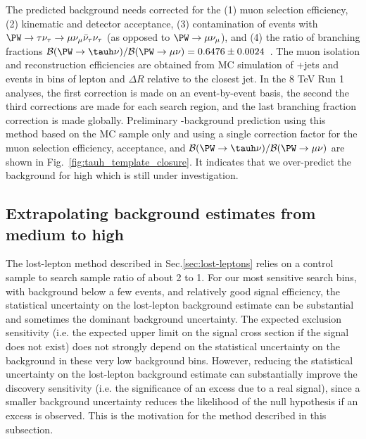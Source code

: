 % 
The predicted background needs corrected for the (1) muon selection efficiency, 
(2) kinematic and detector acceptance, 
(3) contamination of events with $\PW\rightarrow\tau\nu_{\tau}\rightarrow\mu\nu_\mu\bar{\nu}_{\tau}\nu_{\tau}$
(as opposed to $\PW\rightarrow\mu\nu_{\mu}$),
and (4) the ratio of branching fractions
$\mathcal{B}(\PW\rightarrow\tauh\nu)/\mathcal{B}(\PW\rightarrow\mu\nu)= 0.6476 \pm 0.0024$~\cite{PDG}.
The muon isolation and reconstruction efficiencies
are obtained from MC simulation of \PW{}+jets and \ttbar events 
in bins of lepton \pt and $\Delta R$
relative to the closest jet.
In the 8 TeV Run 1 analyses, the first correction is made on an event-by-event basis,
the second the third corrections are made for each search region, and the
last branching fraction correction is made globally.
Preliminary \tauh{}-background prediction using this method based on the \ttbar MC sample
only and using a single correction factor for the muon selection efficiency,
acceptance, and $\mathcal{B}(\PW\rightarrow\tauh\nu)/\mathcal{B}(\PW\rightarrow\mu\nu)$
are shown in Fig.~\ref{fig:tauh_template_closure}.
It indicates that we over-predict the background for high \nbjets which is still under investigation.




\clearpage
\subsection{Extrapolating background estimates from medium to high \MHT }
\label{sec:mht-extrapolation}

The lost-lepton method described in Sec.\ref{sec:lost-leptons} relies on a control sample to search
sample ratio of about 2 to 1.
For our most sensitive search bins, with background below a few events, and relatively good signal efficiency,
the statistical uncertainty on the lost-lepton background estimate can be substantial and sometimes
the dominant background uncertainty.
The expected exclusion sensitivity (i.e. the expected upper limit on the signal cross section
if the signal does not exist) does not strongly depend on the statistical uncertainty on the
background in these very low background bins.
However, reducing the statistical uncertainty on the lost-lepton background estimate can substantially
improve the discovery sensitivity (i.e. the significance of an excess due to a real signal), since a
smaller background uncertainty reduces the likelihood of the null hypothesis if an excess is observed.
This is the motivation for the method described in this subsection.

